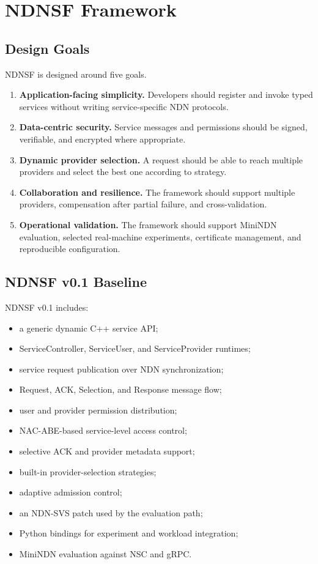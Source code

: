 \chapter{NDNSF Framework}
\label{chap:ndnsf}

\section{Design Goals}

NDNSF is designed around five goals.

\begin{enumerate}[leftmargin=*]
  \item \textbf{Application-facing simplicity.} Developers should register and
  invoke typed services without writing service-specific NDN protocols.
  \item \textbf{Data-centric security.} Service messages and permissions
  should be signed, verifiable, and encrypted where appropriate.
  \item \textbf{Dynamic provider selection.} A request should be able to reach
  multiple providers and select the best one according to strategy.
  \item \textbf{Collaboration and resilience.} The framework should support
  multiple providers, compensation after partial failure, and cross-validation.
  \item \textbf{Operational validation.} The framework should support MiniNDN
  evaluation, selected real-machine experiments, certificate management, and
  reproducible configuration.
\end{enumerate}

\section{NDNSF v0.1 Baseline}

NDNSF v0.1 includes:

\begin{itemize}
  \item a generic dynamic C++ service API;
  \item ServiceController, ServiceUser, and ServiceProvider runtimes;
  \item service request publication over NDN synchronization;
  \item Request, ACK, Selection, and Response message flow;
  \item user and provider permission distribution;
  \item NAC-ABE-based service-level access control;
  \item selective ACK and provider metadata support;
  \item built-in provider-selection strategies;
  \item adaptive admission control;
  \item an NDN-SVS patch used by the evaluation path;
  \item Python bindings for experiment and workload integration;
  \item MiniNDN evaluation against NSC and gRPC.
\end{itemize}

